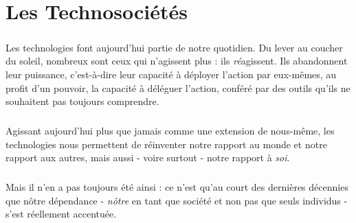 \chapter{Les Technosociétés}

\paragraph{} Les technologies font aujourd'hui partie de notre quotidien. Du lever au coucher du soleil, nombreux sont
ceux qui n'agissent plus : ils \emph{ré}agissent. Ils abandonnent leur puissance, c'est-à-dire leur capacité à déployer
l'action par eux-mêmes, au profit d'un pouvoir, la capacité à déléguer l'action, conféré par des outils qu'ils ne 
souhaitent pas toujours comprendre.

\paragraph{} Agissant aujourd'hui plus que jamais comme une extension de nous-même, les technologies nous permettent de
réinventer notre rapport au monde et notre rapport aux autres, mais aussi - voire surtout - notre rapport à \emph{soi}.
\cite{Damasio2}

\paragraph{} Mais il n'en a pas toujours été ainsi : ce n'est qu'au court des dernières décennies que nôtre dépendance
- \emph{nôtre} en tant que société et non pas que seuls individus - s'est réellement accentuée.



 

